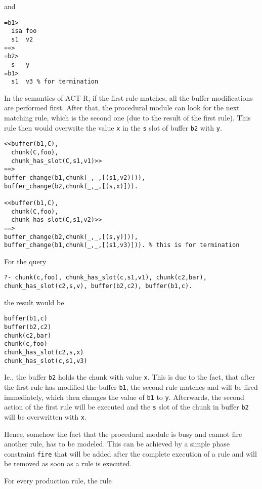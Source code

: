 and

\begin{lstlisting}
=b1>
  isa foo
  s1  v2
==>
=b2>
  s   y
=b1>
  s1  v3 % for termination
\end{lstlisting}

In the semantics of ACT-R, if the first rule matches, all the buffer modifications are performed first. After that, the procedural module can look for the next matching rule, which is the second one (due to the result of the first rule). This rule then would overwrite the value \verb|x| in the \verb|s| slot of buffer \verb|b2| with \verb|y|.

\begin{lstlisting}
<<buffer(b1,C),
  chunk(C,foo),
  chunk_has_slot(C,s1,v1)>>
==>
buffer_change(b1,chunk(_,_,[(s1,v2)])),
buffer_change(b2,chunk(_,_,[(s,x)])).

<<buffer(b1,C),
  chunk(C,foo),
  chunk_has_slot(C,s1,v2)>>
==>
buffer_change(b2,chunk(_,_,[(s,y)])),
buffer_change(b1,chunk(_,_,[(s1,v3)])). % this is for termination
\end{lstlisting}

For the query

\begin{lstlisting}
?- chunk(c,foo), chunk_has_slot(c,s1,v1), chunk(c2,bar), chunk_has_slot(c2,s,v), buffer(b2,c2), buffer(b1,c).
\end{lstlisting}

the result would be

\begin{lstlisting}
buffer(b1,c)
buffer(b2,c2)
chunk(c2,bar)
chunk(c,foo)
chunk_has_slot(c2,s,x)
chunk_has_slot(c,s1,v3)
\end{lstlisting}

Ie., the buffer \verb|b2| holds the chunk with value \verb|x|. This is due to the fact, that after the first rule has modified the buffer \verb|b1|, the second rule matches and will be fired immediately, which then changes the value of \verb|b1| to \verb|y|. Afterwards, the second action of the first rule will be executed and the \verb|s| slot of the chunk in buffer \verb|b2| will be overwritten with \verb|x|.

Hence, somehow the fact that the procedural module is busy and cannot fire another rule, has to be modeled. This can be achieved by a simple phase constraint \verb|fire| that will be added after the complete execution of a rule and will be removed as soon as a rule is executed.

For every production rule, the rule

